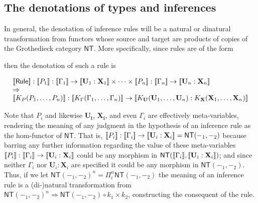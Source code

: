 \subsection{The denotations of types and inferences}
In general, the denotation of inference rules will be a natural or dinatural transformation from functors whose source and target are products of copies of the Grothedieck category $\mathsf{NT}$. More specifically, since rules are of the form

\begin{mathpar}
\end{mathpar}

then the denotation of such a rule is

$$\begin{array}{l}
  \meaningof{\mathsf{Rule}} : \meaningof{P_{1}} : \meaningof{\Gamma_{1}} \to \meaningof{\mathbf{U}_{1} : \mathbf{X}_{1}} \times \cdots \times \meaningof{P_{n}} : \meaningof{\Gamma_{n}} \to \meaningof{\mathbf{U}_{n} : \mathbf{X}_{n}} \\\Rightarrow\\ \meaningof{K_{P}(P_{1},\ldots,P_{n})} : \meaningof{K_{\Gamma}(\Gamma_{1},\ldots,\Gamma_{n})} \to \meaningof{K_{\mathbf{U}}(\mathbf{U}_{1},\ldots,\mathbf{U}_{n}) : K_{\mathbf{X}}(\mathbf{X}_{1},\ldots,\mathbf{X}_{n})}
\end{array}$$

Note that $P_{i}$ and likewise $\mathbf{U_{i}}$, $\mathbf{X_{i}}$, and
even $\Gamma_{i}$ are effectively meta-variables, rendering the
meaning of any judgment in the hypothesis of an inference rule as the
hom-functor of $\mathsf{NT}$. That is, $\meaningof{P_{i}} : \meaningof{\Gamma_{i}} \to \meaningof{\mathbf{U}_{i} : \mathbf{X}_{i}} = \mathsf{NT}(-_{1},-_{2})$ because barring any further information regarding the value of these meta-variables $\meaningof{P_{i}} : \meaningof{\Gamma_{i}} \to \meaningof{\mathbf{U}_{i} : \mathbf{X}_{i}}$ could be any morphism in $\mathsf{NT}(\meaningof{\Gamma_{i}},\meaningof{\mathbf{U}_{i} : \mathbf{X}_{i}})$; and since neither $\Gamma_{i}$ nor $\mathbf{U}_{i} : \mathbf{X}_{i}$ are specified it could be any morphism in $\mathsf{NT}(-_{1},-_{2})$. Thus, if we let $\mathsf{NT}(-_{1}, -_{2})^n = \Pi_{i}^{n}\mathsf{NT}(-_{1}, -_{2})$ the meaning of an inference rule is a (di-)natural transformation from $\mathsf{NT}(-_{1}, -_{2})^{n} \Rightarrow \mathsf{NT}(-_{1}, -_{2}) \circ k_{1} \times k_{2}$, constructing the consequent of the rule.

